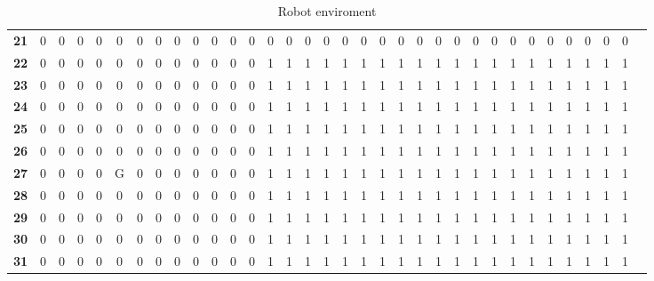 \documentclass[Main]{subfiles}
\begin{document}
\begin{table}[H]
{\begin{tabular}{cccccccccccccccccccccccccccccccccc}
			\textbf{21} &  0 &  0 &  0 &  0 &  0 &  0 &  0 &  0 &  0 &  0 &  0 &  0 &  0 &  0 &  0 &  0 &  0 &  0 &  0 &  0 &  0 &  0 &  0 &  0 &  0 &  0 &  0 &  0 &  0 &  0 &  0 &  0 \\
			\textbf{22} &  0 &  0 &  0 &  0 &  0 &  0 &  0 &  0 &  0 &  0 &  0 &  0 &  1 &  1 &  1 &  1 &  1 &  1 &  1 &  1 &  1 &  1 &  1 &  1 &  1 &  1 &  1 &  1 &  1 &  1 &  1 &  1 \\
			\textbf{23} &  0 &  0 &  0 &  0 &  0 &  0 &  0 &  0 &  0 &  0 &  0 &  0 &  1 &  1 &  1 &  1 &  1 &  1 &  1 &  1 &  1 &  1 &  1 &  1 &  1 &  1 &  1 &  1 &  1 &  1 &  1 &  1 \\
			\textbf{24} &  0 &  0 &  0 &  0 &  0 &  0 &  0 &  0 &  0 &  0 &  0 &  0 &  1 &  1 &  1 &  1 &  1 &  1 &  1 &  1 &  1 &  1 &  1 &  1 &  1 &  1 &  1 &  1 &  1 &  1 &  1 &  1 \\
			\textbf{25} &  0 &  0 &  0 &  0 &  0 &  0 &  0 &  0 &  0 &  0 &  0 &  0 &  1 &  1 &  1 &  1 &  1 &  1 &  1 &  1 &  1 &  1 &  1 &  1 &  1 &  1 &  1 &  1 &  1 &  1 &  1 &  1 \\
			\textbf{26} &  0 &  0 &  0 &  0 &  0 &  0 &  0 &  0 &  0 &  0 &  0 &  0 &  1 &  1 &  1 &  1 &  1 &  1 &  1 &  1 &  1 &  1 &  1 &  1 &  1 &  1 &  1 &  1 &  1 &  1 &  1 &  1 \\
			\textbf{27} &  0 &  0 &  0 &  0 &  G &  0 &  0 &  0 &  0 &  0 &  0 &  0 &  1 &  1 &  1 &  1 &  1 &  1 &  1 &  1 &  1 &  1 &  1 &  1 &  1 &  1 &  1 &  1 &  1 &  1 &  1 &  1 \\
			\textbf{28} &  0 &  0 &  0 &  0 &  0 &  0 &  0 &  0 &  0 &  0 &  0 &  0 &  1 &  1 &  1 &  1 &  1 &  1 &  1 &  1 &  1 &  1 &  1 &  1 &  1 &  1 &  1 &  1 &  1 &  1 &  1 &  1 \\
			\textbf{29} &  0 &  0 &  0 &  0 &  0 &  0 &  0 &  0 &  0 &  0 &  0 &  0 &  1 &  1 &  1 &  1 &  1 &  1 &  1 &  1 &  1 &  1 &  1 &  1 &  1 &  1 &  1 &  1 &  1 &  1 &  1 &  1 \\
			\textbf{30} &  0 &  0 &  0 &  0 &  0 &  0 &  0 &  0 &  0 &  0 &  0 &  0 &  1 &  1 &  1 &  1 &  1 &  1 &  1 &  1 &  1 &  1 &  1 &  1 &  1 &  1 &  1 &  1 &  1 &  1 &  1 &  1 \\
			\textbf{31} &  0 &  0 &  0 &  0 &  0 &  0 &  0 &  0 &  0 &  0 &  0 &  0 &  1 &  1 &  1 &  1 &  1 &  1 &  1 &  1 &  1 &  1 &  1 &  1 &  1 &  1 &  1 &  1 &  1 &  1 &  1 &  1 \\
			\end{tabular}
		}
		\caption{Robot enviroment}
		\label{table:realmap} 
	\end{table} \noindent
	
\end{document}
